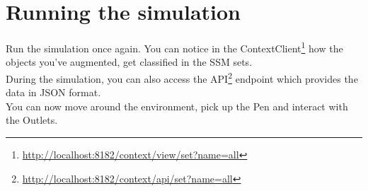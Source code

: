 \section{Running the simulation} %
\label{sec:sd_running_the_simulation}
Run the simulation once again. You can notice in the ContextClient\footnote{\url{http://localhost:8182/context/view/set?name=all}} how the objects you've augmented, get classified in the SSM sets.\\

During the simulation, you can also access the API\footnote{\url{http://localhost:8182/context/api/set?name=all}} endpoint which provides the data in JSON format.\\

You can now move around the environment, pick up the Pen and interact with the Outlets.
